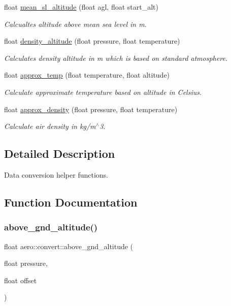 \begin{DoxyCompactItemize}
float \hyperlink{namespaceaero_1_1convert_a41de71a2cd962f132ed1725f2bf3322d}{mean\+\_\+sl\+\_\+altitude} (float agl, float start\+\_\+alt)
\begin{DoxyCompactList}\small\item\em Calcualtes altitude above mean sea level in m. \end{DoxyCompactList}\item 
float \hyperlink{namespaceaero_1_1convert_ad11c320fabe5ed6d5356870efe473ed1}{density\+\_\+altitude} (float pressure, float temperature)
\begin{DoxyCompactList}\small\item\em Calculates density altitude in m which is based on standard atmosphere. \end{DoxyCompactList}\item 
float \hyperlink{namespaceaero_1_1convert_aa3adf5c29a73465ac7f697c906accb33}{approx\+\_\+temp} (float temperature, float altitude)
\begin{DoxyCompactList}\small\item\em Calculate approximate temperature based on altitude in Celsius. \end{DoxyCompactList}\item 
float \hyperlink{namespaceaero_1_1convert_a77f3e5181a417c93f2870a4cbede5011}{approx\+\_\+density} (float pressure, float temperature)
\begin{DoxyCompactList}\small\item\em Calculate air density in kg/m$^\wedge$3. \end{DoxyCompactList}\end{DoxyCompactItemize}


\subsection{Detailed Description}
Data conversion helper functions. 

\subsection{Function Documentation}
\mbox{\label{namespaceaero_1_1convert_a05ebdd5d199459299bdd167c089d7d12}} 
\subsubsection{\texorpdfstring{above\+\_\+gnd\+\_\+altitude()}{above\_gnd\_altitude()}}
{\footnotesize\ttfamily float aero\+::convert\+::above\+\_\+gnd\+\_\+altitude (\begin{DoxyParamCaption}\item[{float}]{pressure,  }\item[{float}]{offset }\end{DoxyParamCaption})}



